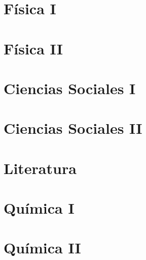 \documentclass[12pt,letterpaper,twocolumn,oneside]{report}
\begin{document}

\chapter{F\'{i}sica I}\label{chap:phy1}



\chapter{F\'{i}sica II}\label{chap:phy2}




\chapter{Ciencias Sociales I}\label{chap:soc1}


\chapter{Ciencias Sociales II}\label{chap:soc2}



\chapter{Literatura}\label{chap:lit1}




\chapter{Qu\'{i}mica I}\label{chap:quim1}


\chapter{Qu\'{i}mica II}\label{chap:quim2}


\end{document}
